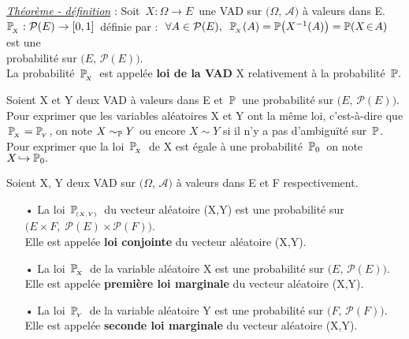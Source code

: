 \vspace{1.3cm}

\underline{\emph{Théorème - définition}} : Soit \(\,X:\Omega \to E\,\) une VAD sur \(\bigl(\Omega,\,\mathcal{A}\bigr)\) à valeurs dans E.\vspace{0.1cm}\\
\(\mathbb{P}_{\!_X}:\mathcal{P}(E)\to [0,1]\,\) définie par : \(\;\forall A\in \mathcal{P}(E),\ \: \PP_{\!_X}(A)=\PP\bigl(X^{-1}(A)\bigr)=\PP(X\!\in\! A)\) est une\vspace{0.1cm}\\
probabilité sur \(\bigl(E,\, \mathcal{P}(E)\bigr)\).\vspace{0.1cm}\\
La probabilité \(\,\mathbb{P}_{\!_X}\,\) est appelée \textbf{loi de la VAD} X relativement à la probabilité \(\,\mathbb{P}.\)

\vspace{1.5cm}

Soient X et Y deux VAD à valeurs dans E et \(\,\mathbb{P}\,\) une probabilité sur \(\bigl(E,\, \mathcal{P}(E)\bigr)\). Pour exprimer que les variables aléatoires X et Y ont la même loi, c'est-à-dire que \(\,\mathbb{P}_{\!_X}=\mathbb{P}_{\!_Y}\), on note \(X\sim_{\mathbb{P}} Y\) ou encore \(X\sim Y\) si il n'y a pas d'ambiguïté sur \(\,\mathbb{P}\).\vspace{0.4cm}\\
Pour exprimer que la loi \(\,\mathbb{P}_{\!_X}\,\) de X est égale à une probabilité \(\,\mathbb{P}_0\,\) on note \(X\!\hookrightarrow \mathbb{P}_0.\)

\newpage

\noindent Soient X, Y deux VAD sur \(\bigl(\Omega,\,\mathcal{A}\bigr)\) à valeurs dans E et F respectivement.
\begin{itemize}\vspace{-0.1cm}
    \item[•] La loi \(\,\mathbb{P}_{\!_{(X,Y)}}\,\) du vecteur aléatoire (X,Y) est une probabilité sur \(\bigl(E\!\times\! F,\; \mathcal{P}(E)\!\times \!\mathcal{P}(F)\bigr)\).\\
    Elle est appelée \textbf{loi conjointe} du vecteur aléatoire (X,Y).

    \item[•] La loi \(\,\mathbb{P}_{\!_X}\,\) de la variable aléatoire X est une probabilité sur \(\bigl(E,\, \mathcal{P}(E)\bigr)\).\\
    Elle est appelée \textbf{première loi marginale} du vecteur aléatoire (X,Y).

    \item[•] La loi \(\,\mathbb{P}_{\!_Y}\,\) de la variable aléatoire Y est une probabilité sur \(\bigl(F,\, \mathcal{P}(F)\bigr)\).\\
    Elle est appelée \textbf{seconde loi marginale} du vecteur aléatoire (X,Y).
\end{itemize}

